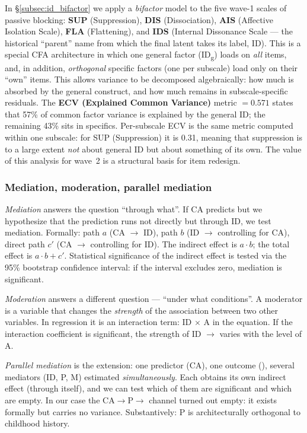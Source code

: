In §\ref{subsec:id_bifactor} we apply a \emph{bifactor} model to the five wave-1 scales of passive blocking: \textbf{SUP} (Suppression), \textbf{DIS} (Dissociation), \textbf{AIS} (Affective Isolation Scale), \textbf{FLA} (Flattening), and \textbf{IDS} (Internal Dissonance Scale --- the historical ``parent'' name from which the final latent takes its label, ID). This is a special CFA architecture in which one general factor (ID\textsubscript{g}) loads on \emph{all} items, and, in addition, \emph{orthogonal} specific factors (one per subscale) load only on their ``own'' items. This allows variance to be decomposed algebraically: how much is absorbed by the general construct, and how much remains in subscale-specific residuals. The \textbf{ECV (Explained Common Variance)} metric $= 0.571$ states that 57\% of common factor variance is explained by the general ID; the remaining 43\% sits in specifics. Per-subscale ECV is the same metric computed within one subscale: for SUP (Suppression) it is 0.31, meaning that suppression is to a large extent \emph{not} about general ID but about something of its own. The value of this analysis for wave~2 is a structural basis for item redesign.

\subsubsection{Mediation, moderation, parallel mediation}

\emph{Mediation} answers the question ``through what''. If CA predicts \EAF{} but we hypothesize that the prediction runs not directly but through ID, we test mediation. Formally: path $a$ (CA $\to$ ID), path $b$ (ID $\to$ \EAF{} controlling for CA), direct path $c'$ (CA $\to$ \EAF{} controlling for ID). The indirect effect is $a \cdot b$; the total effect is $a \cdot b + c'$. Statistical significance of the indirect effect is tested via the 95\% bootstrap confidence interval: if the interval excludes zero, mediation is significant.

\emph{Moderation} answers a different question --- ``under what conditions''. A moderator is a variable that changes the \emph{strength} of the association between two other variables. In regression it is an interaction term: ID $\times$ A in the \EAF{} equation. If the interaction coefficient is significant, the strength of ID $\to$ \EAF{} varies with the level of A.

\emph{Parallel mediation} is the extension: one predictor (CA), one outcome (\EAF{}), several mediators (ID, P, M) estimated \emph{simultaneously}. Each obtains its own indirect effect (through itself), and we can test which of them are significant and which are empty. In our case the CA$\to$P$\to$\EAF{} channel turned out empty: it exists formally but carries no variance. Substantively: P is architecturally orthogonal to childhood history.


